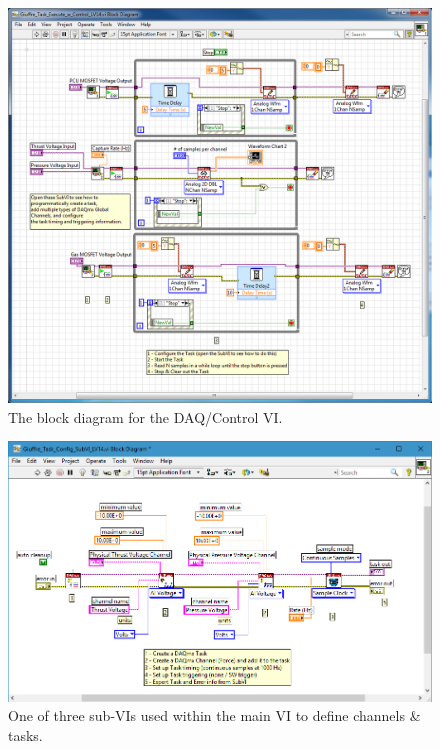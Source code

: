 \documentclass[journal]{IEEEtran}
\begin{document}
\begin{figure}[htp]
  \includegraphics[height=.5\vsize,keepaspectratio]{figs/VI_30Mar17.png}
  \caption{The block diagram for the DAQ/Control VI.\@
\label{fig:VI-blockdiagram}
}
\end{figure}

\begin{figure}[htp]
  \includegraphics[height=.4\vsize,keepaspectratio]{figs/VI_30Mar17_SubVI.png}
  \caption{One of three sub-VIs used within the main VI to define channels \& tasks.
\label{fig:VI-subVI}
}
\end{figure}
\end{document}
